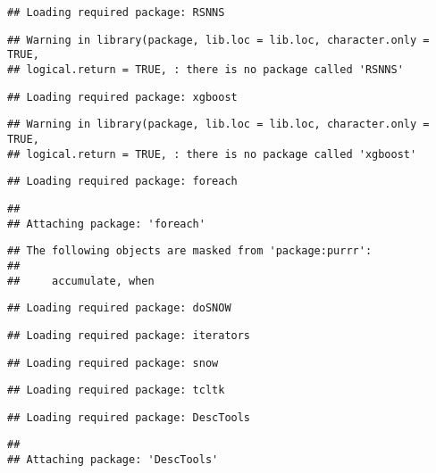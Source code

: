 \documentclass[]{article}
\begin{document}
\begin{verbatim}
## Loading required package: RSNNS
\end{verbatim}

\begin{verbatim}
## Warning in library(package, lib.loc = lib.loc, character.only = TRUE,
## logical.return = TRUE, : there is no package called 'RSNNS'
\end{verbatim}

\begin{verbatim}
## Loading required package: xgboost
\end{verbatim}

\begin{verbatim}
## Warning in library(package, lib.loc = lib.loc, character.only = TRUE,
## logical.return = TRUE, : there is no package called 'xgboost'
\end{verbatim}

\begin{verbatim}
## Loading required package: foreach
\end{verbatim}

\begin{verbatim}
## 
## Attaching package: 'foreach'
\end{verbatim}

\begin{verbatim}
## The following objects are masked from 'package:purrr':
## 
##     accumulate, when
\end{verbatim}

\begin{verbatim}
## Loading required package: doSNOW
\end{verbatim}

\begin{verbatim}
## Loading required package: iterators
\end{verbatim}

\begin{verbatim}
## Loading required package: snow
\end{verbatim}

\begin{verbatim}
## Loading required package: tcltk
\end{verbatim}

\begin{verbatim}
## Loading required package: DescTools
\end{verbatim}

\begin{verbatim}
## 
## Attaching package: 'DescTools'
\end{verbatim}
\end{document}
